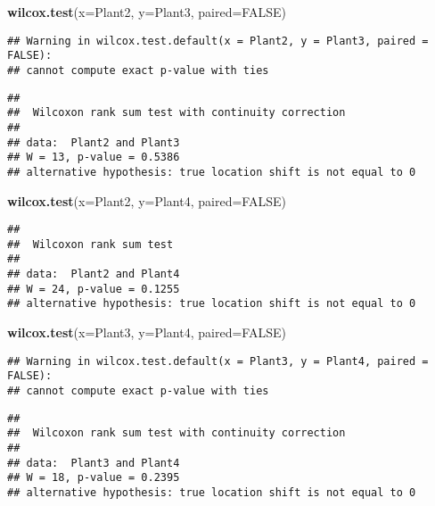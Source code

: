 \documentclass[]{article}
\newenvironment{Shaded}{\begin{snugshade}}{\end{snugshade}}
\newcommand{\KeywordTok}[1]{\textcolor[rgb]{0.13,0.29,0.53}{\textbf{#1}}}
\newcommand{\DataTypeTok}[1]{\textcolor[rgb]{0.13,0.29,0.53}{#1}}
\newcommand{\OtherTok}[1]{\textcolor[rgb]{0.56,0.35,0.01}{#1}}
\newcommand{\NormalTok}[1]{#1}
\begin{document}
\begin{Shaded}
\begin{Highlighting}[]
\KeywordTok{wilcox.test}\NormalTok{(}\DataTypeTok{x=}\NormalTok{Plant2, }\DataTypeTok{y=}\NormalTok{Plant3, }\DataTypeTok{paired=}\OtherTok{FALSE}\NormalTok{)}
\end{Highlighting}
\end{Shaded}

\begin{verbatim}
## Warning in wilcox.test.default(x = Plant2, y = Plant3, paired = FALSE):
## cannot compute exact p-value with ties
\end{verbatim}

\begin{verbatim}
## 
##  Wilcoxon rank sum test with continuity correction
## 
## data:  Plant2 and Plant3
## W = 13, p-value = 0.5386
## alternative hypothesis: true location shift is not equal to 0
\end{verbatim}

\begin{Shaded}
\begin{Highlighting}[]
\KeywordTok{wilcox.test}\NormalTok{(}\DataTypeTok{x=}\NormalTok{Plant2, }\DataTypeTok{y=}\NormalTok{Plant4, }\DataTypeTok{paired=}\OtherTok{FALSE}\NormalTok{)}
\end{Highlighting}
\end{Shaded}

\begin{verbatim}
## 
##  Wilcoxon rank sum test
## 
## data:  Plant2 and Plant4
## W = 24, p-value = 0.1255
## alternative hypothesis: true location shift is not equal to 0
\end{verbatim}

\begin{Shaded}
\begin{Highlighting}[]
\KeywordTok{wilcox.test}\NormalTok{(}\DataTypeTok{x=}\NormalTok{Plant3, }\DataTypeTok{y=}\NormalTok{Plant4, }\DataTypeTok{paired=}\OtherTok{FALSE}\NormalTok{)}
\end{Highlighting}
\end{Shaded}

\begin{verbatim}
## Warning in wilcox.test.default(x = Plant3, y = Plant4, paired = FALSE):
## cannot compute exact p-value with ties
\end{verbatim}

\begin{verbatim}
## 
##  Wilcoxon rank sum test with continuity correction
## 
## data:  Plant3 and Plant4
## W = 18, p-value = 0.2395
## alternative hypothesis: true location shift is not equal to 0
\end{verbatim}
\end{document}
